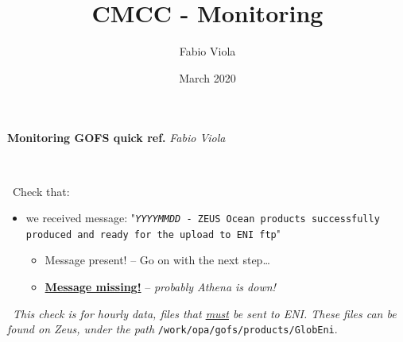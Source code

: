 \documentclass[twocolumn,8pt]{article}
\title{CMCC - Monitoring}
\author{Fabio Viola}
\date{March 2020}
\begin{document}

\LARGE \textbf{Monitoring GOFS quick ref.}  \hfill \textit{\small Fabio Viola}\normalsize

\ 

\begin{mdframed}[frametitle=(A.1)\ -- At 9 am]

\faSend\ Check that:

\begin{itemize}\itemsep0pt 
    \item we received message: "\texttt{\textit{YYYYMMDD} - ZEUS Ocean prod\-ucts successfully produced and ready for the upload to ENI ftp}"
        \begin{itemize}\itemsep0pt
        \item[{\textcolor{ForestGreen}{\faCheckCircle}}] Message present! -- Go on with the next step\dots
        \item[{\textcolor{Red}{\faTimesCircle}}] \ul{\textbf{Message missing!}} -- \textit{probably Athena is down!}
    \end{itemize}
\end{itemize}

\faInfoCircle\ \textit{This check is for hourly data, files that \ul{must} be sent to ENI. These files can be found on Zeus, under the path} \texttt{/work/opa/gofs/products/GlobEni}.

\end{mdframed}
\end{document}
